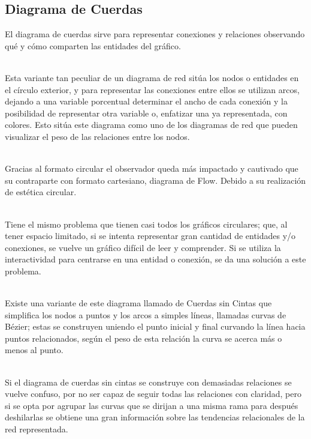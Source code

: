 \documentclass{article}\usepackage[]{graphicx}\usepackage[]{color}
\begin{document}
\subsection{Diagrama de Cuerdas}\label{ssec:ana_cuerdas}
El diagrama de cuerdas sirve para representar conexiones y relaciones observando qu\'e y c\'omo comparten las entidades del gr\'afico.~\\~\par
Esta variante tan peculiar de un diagrama de red sit\'ua los nodos o entidades en el c\'irculo exterior, y para representar las conexiones entre ellos se utilizan arcos, dejando a una variable porcentual determinar el ancho de cada conexi\'on y la posibilidad de representar otra variable o, enfatizar una ya representada, con colores. Esto sit\'ua este diagrama como uno de los diagramas de red que pueden visualizar el peso de las relaciones entre los nodos\cite{cycling-chord}\cite{refugee-chord}\cite{chord-charts}.~\\~\par
Gracias al formato circular el observador queda m\'as impactado y cautivado que su contraparte con formato cartesiano, diagrama de Flow\cite{flow-example}. Debido a su realizaci\'on de est\'etica circular.~\\~\par
Tiene el mismo problema que tienen casi todos los gr\'aficos circulares; que, al tener espacio limitado, si se intenta representar gran cantidad de entidades y/o conexiones, se vuelve un gr\'afico dif\'icil de leer y comprender. Si se utiliza la interactividad para centrarse en una entidad o conexi\'on, se da una soluci\'on a este problema.~\\~\par
Existe una variante de este diagrama llamado de Cuerdas sin Cintas que simplifica los nodos a puntos y los arcos a simples l\'ineas, llamadas curvas de B\'ezier; estas se construyen uniendo el punto inicial y final curvando la l\'inea hacia puntos relacionados,  seg\'un el peso de esta relaci\'on la curva se acerca m\'as o menos al punto\cite{estructuras-jerarquicas}.~\\~\par
\clearpage
Si el diagrama de cuerdas sin cintas se construye con demasiadas relaciones se vuelve confuso, por no ser capaz de seguir todas las relaciones con claridad, pero si se opta por agrupar las curvas que se dirijan a una misma rama para despu\'es deshilarlas se obtiene una gran informaci\'on sobre las tendencias relacionales de la red representada\cite{estructuras-jerarquicas}.~\\~\par
\end{document}
